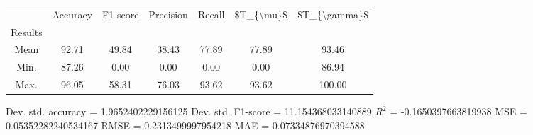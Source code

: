 \begin{tabular}{|c|c|c|c|c|c|c|}
\toprule
{} &  Accuracy &  F1 score &  Precision &  Recall &  \$T\_\{\textbackslash mu\}\$ &  \$T\_\{\textbackslash gamma\}\$ \\
Results &           &           &            &         &            &               \\
\hline
Mean    &     92.71 &     49.84 &      38.43 &   77.89 &      77.89 &         93.46 \\
Min.    &     87.26 &      0.00 &       0.00 &    0.00 &       0.00 &         86.94 \\
Max.    &     96.05 &     58.31 &      76.03 &   93.62 &      93.62 &        100.00 \\
\bottomrule
\end{tabular}

 Dev. std. accuracy = 1.9652402229156125
 Dev. std. F1-score = 11.154368033140889
 $R^2$ = -0.1650397663819938
 MSE = 0.05352282240534167
 RMSE = 0.2313499997954218
 MAE = 0.07334876970394588